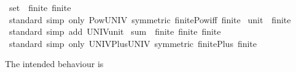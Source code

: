 \begin{isabellebody}
\endisatagproof
{\isafoldproof}%
%
\isadelimproof
\isanewline
%
\endisadelimproof
\isanewline
{}\isamarkupfalse%
\ set\ {\isacharcolon}{\kern0pt}{\isacharcolon}{\kern0pt}\ {\isacharparenleft}{\kern0pt}finite{\isacharparenright}{\kern0pt}\ finite\isanewline
%
\isadelimproof
\ \ %
\endisadelimproof
%
\isatagproof
{}\isamarkupfalse%
\ standard\ {\isacharparenleft}{\kern0pt}simp\ only{\isacharcolon}{\kern0pt}\ Pow{\isacharunderscore}{\kern0pt}UNIV\ {\isacharbrackleft}{\kern0pt}symmetric{\isacharbrackright}{\kern0pt}\ finite{\isacharunderscore}{\kern0pt}Pow{\isacharunderscore}{\kern0pt}iff\ finite{\isacharparenright}{\kern0pt}%
\endisatagproof
{\isafoldproof}%
%
\isadelimproof
\isanewline
%
\endisadelimproof
\isanewline
{}\isamarkupfalse%
\ unit\ {\isacharcolon}{\kern0pt}{\isacharcolon}{\kern0pt}\ finite\isanewline
%
\isadelimproof
\ \ %
\endisadelimproof
%
\isatagproof
{}\isamarkupfalse%
\ standard\ {\isacharparenleft}{\kern0pt}simp\ add{\isacharcolon}{\kern0pt}\ UNIV{\isacharunderscore}{\kern0pt}unit{\isacharparenright}{\kern0pt}%
\endisatagproof
{\isafoldproof}%
%
\isadelimproof
\isanewline
%
\endisadelimproof
\isanewline
{}\isamarkupfalse%
\ sum\ {\isacharcolon}{\kern0pt}{\isacharcolon}{\kern0pt}\ {\isacharparenleft}{\kern0pt}finite{\isacharcomma}{\kern0pt}\ finite{\isacharparenright}{\kern0pt}\ finite\isanewline
%
\isadelimproof
\ \ %
\endisadelimproof
%
\isatagproof
{}\isamarkupfalse%
\ standard\ {\isacharparenleft}{\kern0pt}simp\ only{\isacharcolon}{\kern0pt}\ UNIV{\isacharunderscore}{\kern0pt}Plus{\isacharunderscore}{\kern0pt}UNIV\ {\isacharbrackleft}{\kern0pt}symmetric{\isacharbrackright}{\kern0pt}\ finite{\isacharunderscore}{\kern0pt}Plus\ finite{\isacharparenright}{\kern0pt}%
\endisatagproof
{\isafoldproof}%
%
\isadelimproof
%
\endisadelimproof
%
\isadelimdocument
%
\endisadelimdocument
%
\isatagdocument
%
\isamarkuptrue%
%
\endisatagdocument
{\isafolddocument}%
%
\isadelimdocument
%
\endisadelimdocument
%
\begin{isamarkuptext}%
The intended behaviour is 

\end{isamarkuptext}
\end{isabellebody}
